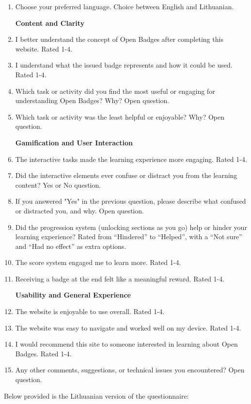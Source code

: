 \begin{enumerate}
  \item Choose your preferred language. Choice between English and Lithuanian.

  \textbf{Content and Clarity}
  \item I better understand the concept of Open Badges after completing this website. Rated 1-4.
  \item I understand what the issued badge represents and how it could be used. Rated 1-4.
  \item Which task or activity did you find the most useful or engaging for understanding Open Badges? Why? Open question.
  \item Which task or activity was the least helpful or enjoyable? Why? Open question.
  
  \textbf{Gamification and User Interaction}
  \item The interactive tasks made the learning experience more engaging. Rated 1-4.
  \item Did the interactive elements ever confuse or distract you from the learning content? Yes or No question.
  \item If you answered "Yes" in the previous question, please describe what confused or distracted you, and why. Open question.
  \item Did the progression system (unlocking sections as you go) help or hinder your learning experience? Rated from “Hindered” to “Helped”, with a “Not sure” and “Had no effect” as extra options.
  \item The score system engaged me to learn more. Rated 1-4.
  \item Receiving a badge at the end felt like a meaningful reward. Rated 1-4.

  \textbf{Usability and General Experience}
  \item The website is enjoyable to use overall. Rated 1-4.
  \item The website was easy to navigate and worked well on my device. Rated 1-4.
  \item I would recommend this site to someone interested in learning about Open Badges. Rated 1-4.
  \item Any other comments, suggestions, or technical issues you encountered? Open question.
\end{enumerate}

Below provided is the Lithuanian version of the questionnaire:

